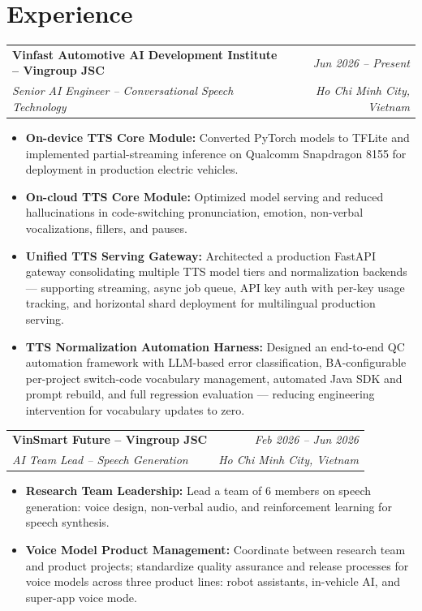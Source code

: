 \documentclass[10pt,a4paper]{article}
\makeatletter
\newcommand{\cventry}[4]{%
  \noindent
  \begin{tabular*}{\linewidth}{@{}l@{\extracolsep{\fill}}r@{}}
    {\color{accent}\textbf{#1}} & \textit{\small #2} \\
    \textit{\small #3} & \textit{\small #4}
  \end{tabular*}%
  \vspace{1pt}%
}
\makeatother
\begin{document}
\section{Experience}

\cventry{Vinfast Automotive AI Development Institute -- Vingroup JSC}{Jun 2026 -- Present}
        {Senior AI Engineer -- Conversational Speech Technology}{Ho Chi Minh City, Vietnam}
\begin{itemize}
  \item \textbf{On-device TTS Core Module:} Converted PyTorch models to TFLite and implemented partial-streaming inference on Qualcomm Snapdragon 8155 for deployment in production electric vehicles.
  \item \textbf{On-cloud TTS Core Module:} Optimized model serving and reduced hallucinations in code-switching pronunciation, emotion, non-verbal vocalizations, fillers, and pauses.
  \item \textbf{Unified TTS Serving Gateway:} Architected a production FastAPI gateway consolidating multiple TTS model tiers and normalization backends — supporting streaming, async job queue, API key auth with per-key usage tracking, and horizontal shard deployment for multilingual production serving.
  \item \textbf{TTS Normalization Automation Harness:} Designed an end-to-end QC automation framework with LLM-based error classification, BA-configurable per-project switch-code vocabulary management, automated Java SDK and prompt rebuild, and full regression evaluation — reducing engineering intervention for vocabulary updates to zero.
\end{itemize}

\vspace{4pt}

\cventry{VinSmart Future -- Vingroup JSC}{Feb 2026 -- Jun 2026}
        {AI Team Lead -- Speech Generation}{Ho Chi Minh City, Vietnam}
\begin{itemize}
  \item \textbf{Research Team Leadership:} Lead a team of 6 members on speech generation: voice design, non-verbal audio, and reinforcement learning for speech synthesis.
  \item \textbf{Voice Model Product Management:} Coordinate between research team and product projects; standardize quality assurance and release processes for voice models across three product lines: robot assistants, in-vehicle AI, and super-app voice mode.
\end{itemize}
\end{document}
